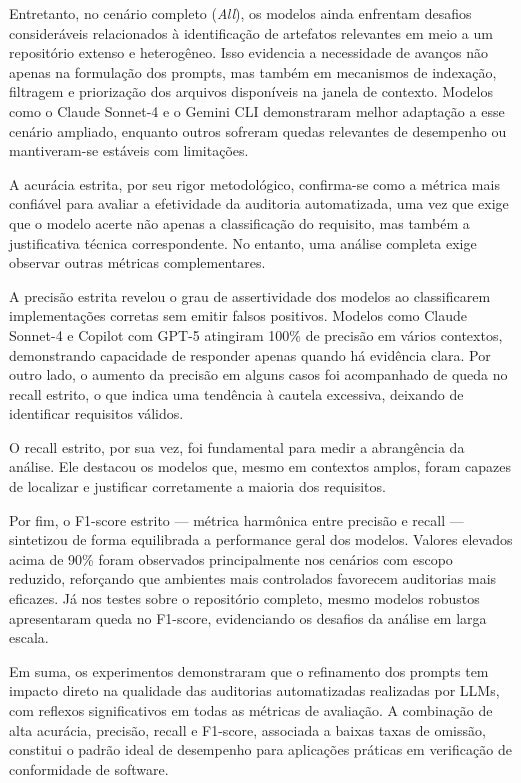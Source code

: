 Entretanto, no cenário completo (\textit{All}), os modelos ainda enfrentam desafios consideráveis relacionados à identificação de artefatos relevantes em meio a um repositório extenso e heterogêneo. Isso evidencia a necessidade de avanços não apenas na formulação dos prompts, mas também em mecanismos de indexação, filtragem e priorização dos arquivos disponíveis na janela de contexto. Modelos como o Claude Sonnet-4 e o Gemini CLI demonstraram melhor adaptação a esse cenário ampliado, enquanto outros sofreram quedas relevantes de desempenho ou mantiveram-se estáveis com limitações.

A acurácia estrita, por seu rigor metodológico, confirma-se como a métrica mais confiável para avaliar a efetividade da auditoria automatizada, uma vez que exige que o modelo acerte não apenas a classificação do requisito, mas também a justificativa técnica correspondente. No entanto, uma análise completa exige observar outras métricas complementares.

A precisão estrita revelou o grau de assertividade dos modelos ao classificarem implementações corretas sem emitir falsos positivos. Modelos como Claude Sonnet-4 e Copilot com GPT-5 atingiram 100\% de precisão em vários contextos, demonstrando capacidade de responder apenas quando há evidência clara. Por outro lado, o aumento da precisão em alguns casos foi acompanhado de queda no recall estrito, o que indica uma tendência à cautela excessiva, deixando de identificar requisitos válidos.

O recall estrito, por sua vez, foi fundamental para medir a abrangência da análise. Ele destacou os modelos que, mesmo em contextos amplos, foram capazes de localizar e justificar corretamente a maioria dos requisitos.

Por fim, o F1-score estrito — métrica harmônica entre precisão e recall — sintetizou de forma equilibrada a performance geral dos modelos. Valores elevados acima de 90\% foram observados principalmente nos cenários com escopo reduzido, reforçando que ambientes mais controlados favorecem auditorias mais eficazes. Já nos testes sobre o repositório completo, mesmo modelos robustos apresentaram queda no F1-score, evidenciando os desafios da análise em larga escala.

Em suma, os experimentos demonstraram que o refinamento dos prompts tem impacto direto na qualidade das auditorias automatizadas realizadas por LLMs, com reflexos significativos em todas as métricas de avaliação. A combinação de alta acurácia, precisão, recall e F1-score, associada a baixas taxas de omissão, constitui o padrão ideal de desempenho para aplicações práticas em verificação de conformidade de software.